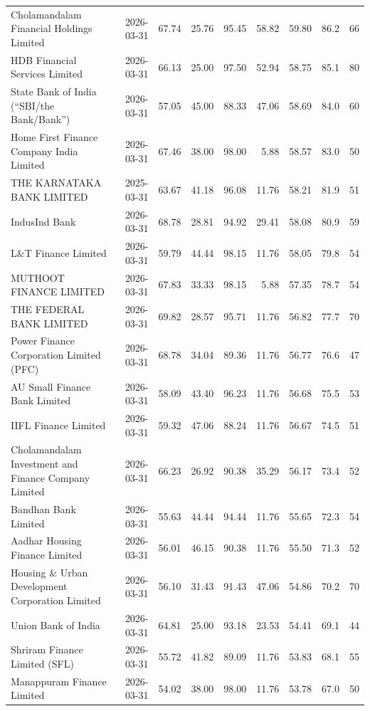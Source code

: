{\begin{longtable}{@{}L{5.1cm}rrrrrrrr@{}}
Cholamandalam Financial Holdings Limited & 2026-03-31 & 67.74 & 25.76 & 95.45 & 58.82 & 59.80 & 86.2 & 66 \\
HDB Financial Services Limited & 2026-03-31 & 66.13 & 25.00 & 97.50 & 52.94 & 58.75 & 85.1 & 80 \\
State Bank of India (\textquotedblleft{}SBI/the Bank/Bank\textquotedblright{}) & 2026-03-31 & 57.05 & 45.00 & 88.33 & 47.06 & 58.69 & 84.0 & 60 \\
Home First Finance Company India Limited & 2026-03-31 & 67.46 & 38.00 & 98.00 & 5.88 & 58.57 & 83.0 & 50 \\
THE KARNATAKA BANK LIMITED & 2025-03-31 & 63.67 & 41.18 & 96.08 & 11.76 & 58.21 & 81.9 & 51 \\
IndusInd Bank & 2026-03-31 & 68.78 & 28.81 & 94.92 & 29.41 & 58.08 & 80.9 & 59 \\
L\&T Finance Limited & 2026-03-31 & 59.79 & 44.44 & 98.15 & 11.76 & 58.05 & 79.8 & 54 \\
MUTHOOT FINANCE LIMITED & 2026-03-31 & 67.83 & 33.33 & 98.15 & 5.88 & 57.35 & 78.7 & 54 \\
THE FEDERAL BANK LIMITED & 2026-03-31 & 69.82 & 28.57 & 95.71 & 11.76 & 56.82 & 77.7 & 70 \\
Power Finance Corporation Limited (PFC) & 2026-03-31 & 68.78 & 34.04 & 89.36 & 11.76 & 56.77 & 76.6 & 47 \\
AU Small Finance Bank Limited & 2026-03-31 & 58.09 & 43.40 & 96.23 & 11.76 & 56.68 & 75.5 & 53 \\
IIFL Finance Limited & 2026-03-31 & 59.32 & 47.06 & 88.24 & 11.76 & 56.67 & 74.5 & 51 \\
Cholamandalam Investment and Finance Company Limited & 2026-03-31 & 66.23 & 26.92 & 90.38 & 35.29 & 56.17 & 73.4 & 52 \\
Bandhan Bank Limited & 2026-03-31 & 55.63 & 44.44 & 94.44 & 11.76 & 55.65 & 72.3 & 54 \\
Aadhar Housing Finance Limited & 2026-03-31 & 56.01 & 46.15 & 90.38 & 11.76 & 55.50 & 71.3 & 52 \\
Housing \& Urban Development Corporation Limited & 2026-03-31 & 56.10 & 31.43 & 91.43 & 47.06 & 54.86 & 70.2 & 70 \\
Union Bank of India & 2026-03-31 & 64.81 & 25.00 & 93.18 & 23.53 & 54.41 & 69.1 & 44 \\
Shriram Finance Limited (SFL) & 2026-03-31 & 55.72 & 41.82 & 89.09 & 11.76 & 53.83 & 68.1 & 55 \\
Manappuram Finance Limited & 2026-03-31 & 54.02 & 38.00 & 98.00 & 11.76 & 53.78 & 67.0 & 50 \\

\end{longtable}}
